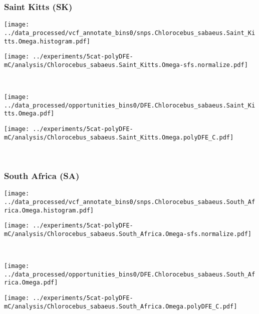 \subsubsection{Saint Kitts (SK)}

\begin{minipage}{0.49\linewidth}
    \texttt{[image: ../data\_processed/vcf\_annotate\_bins0/snps.Chlorocebus\_sabaeus.Saint\_Kitts.Omega.histogram.pdf]}
\end{minipage}
\begin{minipage}{0.49\linewidth}
    \texttt{[image: ../experiments/5cat-polyDFE-mC/analysis/Chlorocebus\_sabaeus.Saint\_Kitts.Omega-sfs.normalize.pdf]}
\end{minipage}
\\
\begin{minipage}{0.49\linewidth}
    \texttt{[image: ../data\_processed/opportunities\_bins0/DFE.Chlorocebus\_sabaeus.Saint\_Kitts.Omega.pdf]}
\end{minipage}
\begin{minipage}{0.49\linewidth}
    \texttt{[image: ../experiments/5cat-polyDFE-mC/analysis/Chlorocebus\_sabaeus.Saint\_Kitts.Omega.polyDFE\_C.pdf]}
\end{minipage}
\\

\subsubsection{South Africa (SA)}

\begin{minipage}{0.49\linewidth}
    \texttt{[image: ../data\_processed/vcf\_annotate\_bins0/snps.Chlorocebus\_sabaeus.South\_Africa.Omega.histogram.pdf]}
\end{minipage}
\begin{minipage}{0.49\linewidth}
    \texttt{[image: ../experiments/5cat-polyDFE-mC/analysis/Chlorocebus\_sabaeus.South\_Africa.Omega-sfs.normalize.pdf]}
\end{minipage}
\\
\begin{minipage}{0.49\linewidth}
    \texttt{[image: ../data\_processed/opportunities\_bins0/DFE.Chlorocebus\_sabaeus.South\_Africa.Omega.pdf]}
\end{minipage}
\begin{minipage}{0.49\linewidth}
    \texttt{[image: ../experiments/5cat-polyDFE-mC/analysis/Chlorocebus\_sabaeus.South\_Africa.Omega.polyDFE\_C.pdf]}
\end{minipage}
\\

